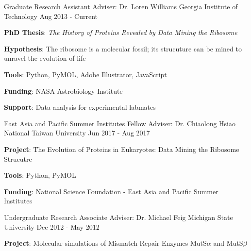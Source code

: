 

\begin{cventries}

  \cventry
    {Graduate Research Assistant} %
    {Adviser: Dr. Loren Williams} %
    {Georgia Institute of Technology} %
    {Aug 2013 - Current} %
    {{\textbf{PhD Thesis}: \textit{The History of Proteins Revealed by Data Mining the Ribosome}}
      \begin{cvitems} %
      \vspace{4.0mm}
        \item {\textbf{Hypothesis}: The ribosome is a molecular fossil; its strucuture can be mined to unravel the evolution of life}
        \item {\textbf{Tools}: Python, PyMOL, Adobe Illustrator, JavaScript}
        \item {\textbf{Funding}: NASA Astrobiology Institute}
        \item {\textbf{Support}: Data analysis for experimental labmates}
      \end{cvitems}
    }
    
  \cventry
    {East Asia and Pacific Summer Institutes Fellow} %
    {Adviser: Dr. Chiaolong Hsiao} %
    {National Taiwan University} %
    {Jun 2017 - Aug 2017} %
    {
      \begin{cvitems} %
      	\item {\textbf{Project}: The Evolution of Proteins in Eukaryotes: Data Mining the Ribosome Strucutre}
        \item {\textbf{Tools}: Python, PyMOL}
        \item {\textbf{Funding}: National Science Foundation - East Asia and Pacific Summer Institutes}
      \end{cvitems}
    }
    
  \cventry
    {Undergraduate Research Associate} %
    {Adviser: Dr. Michael Feig} %
    {Michigan State University} %
    {Dec 2012 - May 2012} %
    {
      \begin{cvitems} %
        \item {\textbf{Project}: Molecular simulations of Mismatch Repair Enzymes MutS$\alpha$ and MutS$\beta$}
      \end{cvitems}
    }


\end{cventries}
